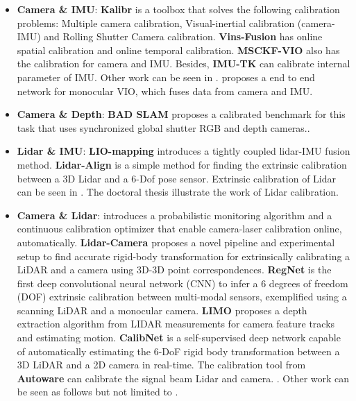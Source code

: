 \documentclass[journal,transmag]{IEEEtran}
\begin{document}
\begin{itemize}
    \item \textbf{Camera \& IMU}: \textbf{Kalibr} \cite{rehder2016extending} is a toolbox that solves the following calibration problems: Multiple camera calibration, Visual-inertial calibration (camera-IMU) and Rolling Shutter Camera calibration. \textbf{Vins-Fusion} \cite{qin2018online} has online spatial calibration  and online temporal calibration.  \textbf{MSCKF-VIO} \cite{sun2018robust} also has the calibration for camera and IMU. Besides, \textbf{IMU-TK} \cite{tpm_icra2014}\cite{pg_imeko2014} can calibrate internal parameter of IMU. Other work can be seen in \cite{li2014high}. \cite{chen2019selective} proposes a end to end network for monocular VIO, which fuses data from camera and IMU.
    \item \textbf{Camera \& Depth}: \textbf{BAD SLAM} \cite{Schops_2019_CVPR} proposes a calibrated benchmark for this task that uses synchronized global shutter RGB and depth cameras..
    \item \textbf{Lidar \& IMU}: \textbf{LIO-mapping} \cite{ye2019tightly} introduces a tightly coupled lidar-IMU fusion method. \textbf{Lidar-Align} is a simple method for finding the extrinsic calibration between a 3D Lidar and a 6-Dof pose sensor. Extrinsic calibration of Lidar can be seen in \cite{yin2018extrinsic}\cite{chen2018extrinsic}. The doctoral thesis \cite{levinson2011automatic} illustrate the work of Lidar calibration. 
    \item \textbf{Camera \& Lidar}: \cite{levinson2013automatic} introduces a probabilistic monitoring algorithm and a continuous calibration optimizer that enable camera-laser calibration online, automatically. \textbf{Lidar-Camera} \cite{2017arXiv170509785D} proposes a novel pipeline and experimental setup to find accurate rigid-body transformation for extrinsically calibrating a LiDAR and a camera using 3D-3D point correspondences. \textbf{RegNet} \cite{schneider2017regnet} is the first deep convolutional neural network (CNN) to infer a 6 degrees of freedom (DOF) extrinsic calibration between multi-modal sensors, exemplified using a scanning LiDAR and a monocular camera. \textbf{LIMO} \cite{Graeter2018LIMO} proposes a depth extraction algorithm from LIDAR measurements for camera feature tracks and estimating motion. \textbf{CalibNet} \cite{iyer2018calibnet} is  a self-supervised deep network capable of automatically estimating the 6-DoF rigid body transformation between a 3D LiDAR and a 2D camera in real-time. The calibration tool from \textbf{Autoware} can calibrate the signal beam Lidar and camera. . Other work can be seen as follows but not limited to \cite{mirzaei20123d}\cite{ishikawa2018lidar}.

\end{itemize}
\end{document}
